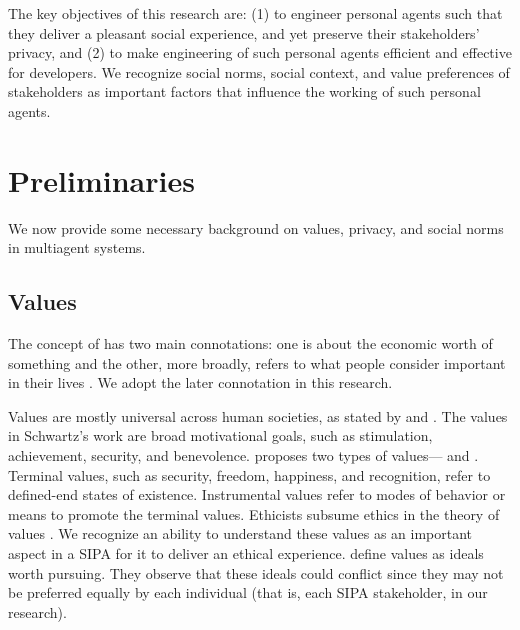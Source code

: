 
The key objectives of this research are: (1) to engineer personal agents
such that they deliver a pleasant social experience, 
and yet preserve their stakeholders' privacy, and (2) to make
engineering of such personal agents efficient and effective for
developers. We recognize social norms, social context, and value preferences 
of stakeholders as important factors that influence the working of 
such personal agents.



\section{Preliminaries}

We now provide some necessary background on values, privacy, and social norms in
multiagent systems.

\subsection{Values}

The concept of  has two main connotations: one is about the economic worth of something and the other, more broadly, refers to what people consider important in their lives \citep{Friedman-2008-value-sensitive-design}. 
We adopt the later connotation in this research.

Values are mostly universal across human societies, as stated by \citet{schwartz2012overview} and \citet{rokeach1973nature}. 
The values in Schwartz's  work are broad motivational goals, such as stimulation, achievement, security, and benevolence. 
\citet{rokeach1973nature} proposes two types of values--- and . 
Terminal values, such as security, freedom, happiness, and recognition, refer to defined-end states of existence. 
Instrumental values refer to modes of behavior or means to promote the terminal values. 
%
Ethicists subsume ethics in the theory of values \citep{Friedman+08:value-sensitive-design}.
% 
We recognize an ability to understand these values as an important aspect in a SIPA for it to deliver an ethical experience.
\citet{Dechesne-AIL13-Norms+Values} define values as ideals worth pursuing. They observe that these ideals could conflict since
they may not be preferred equally by each individual (that is, each SIPA stakeholder, in our research).


